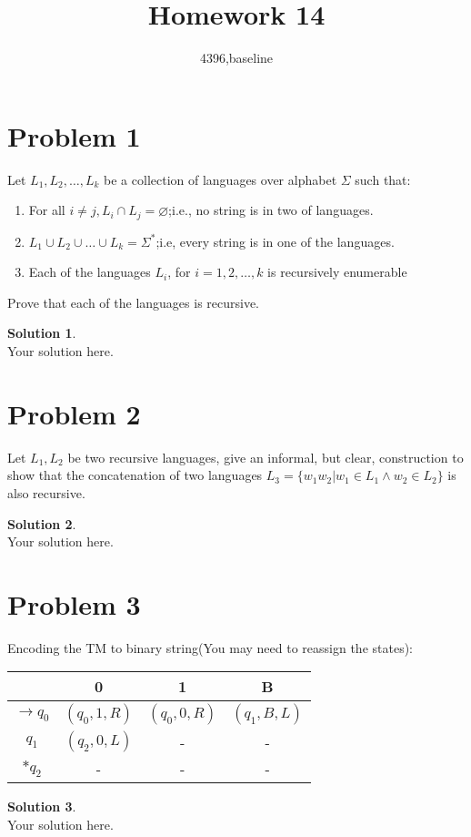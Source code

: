 \documentclass[a4paper,UTF8]{article}
\theoremstyle{definition}
\newtheorem*{solution}{Solution}
\begin{document}
\title{Homework 14}
\author{4396,baseline}
\maketitle


\section*{Problem 1}

Let $L_1,L_2,\dots,L_k$ be a collection of languages over alphabet $\Sigma$ such that:
\begin{enumerate}
	\item For all $i\neq j,L_i\cap L_j=\varnothing$;i.e., no string is in two of languages.
	\item $L_1\cup L_2\cup \dots \cup L_k=\Sigma^*$;i.e, every string is in one of the languages.
	\item Each of the languages $L_i$, for $i=1,2,\dots,k$ is recursively enumerable 
\end{enumerate}

Prove that each of the languages is recursive.
\begin{solution}
	~\\
	Your solution here.
\end{solution}



\section* {Problem 2}
Let $L_1,L_2$ be two recursive languages, give an informal, but clear, construction to show that the concatenation  of two languages $L_3=\{w_1w_2|w_1\in L_1 \land w_2 \in L_2\}$ is also recursive.
\begin{solution}
	~\\
	Your solution here.
\end{solution}


\section* {Problem 3}

Encoding the TM to binary string(You may need to reassign the states):

\begin{tabular}{ |c||c|c|c|   }
	\hline
	& 0 & 1 & B\\
	\hline
	$\rightarrow q_0$   & $(q_0,1,R)$    & $(q_0,0,R)$&   $(q_1,B,L)$\\
	\hline
	$q_1$&   $(q_2,0,L)$ & -   &-\\
	\hline
	$*q_2$&- & -&  -\\
	\hline
\end{tabular}
\begin{solution}
	~\\
	Your solution here.
\end{solution}
\end{document}
